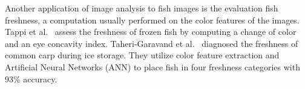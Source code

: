 \documentclass[screen,review]{acmart}
\begin{document}
Another application of image analysis to fish images is the evaluation
fish freshness, a computation usually performed on the color features of
the images.
Tappi et al.~\cite{Tappi2017ComputerVS} assess the freshness of frozen
fish by computing a change of color and an eye concavity index.
Taheri-Garavand et al.~\cite{TaheriGaravand2019RealtimeNM} diagnosed the 
freshness of common carp during ice storage. They utilize color feature
extraction and Artificial Neural Networks (ANN) to place fish in four
freshness categories with 93\% accuracy.
\end{document}
